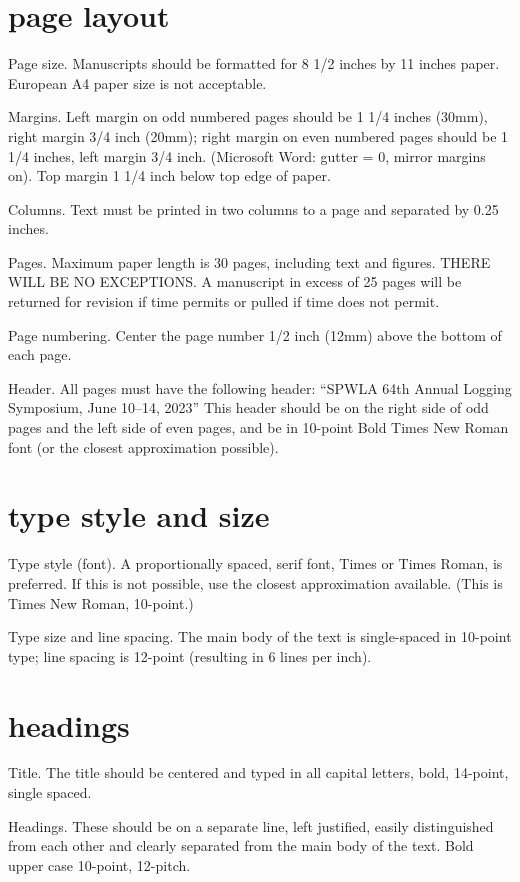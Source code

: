 \documentclass[10pt,twocolumn,twoside]{article}
\begin{document}
\section{page layout}
Page size. Manuscripts should be formatted for 8 1/2 inches by 11 inches paper. European A4 paper size is not acceptable.

Margins. Left margin on odd numbered pages should be 1 1/4 inches (30mm), right margin 3/4 inch (20mm); right margin on even numbered pages should be 1 1/4 inches, left margin 3/4 inch. (Microsoft Word: gutter = 0, mirror margins on). Top margin 1 1/4 inch below top edge of paper.

Columns. Text must be printed in two columns to a page and separated by 0.25 inches. 

Pages. Maximum paper length is 30 pages, including text and figures. THERE WILL BE NO EXCEPTIONS. A manuscript in excess of 25 pages will be returned for revision if time permits or pulled if time does not permit.

Page numbering. Center the page number 1/2 inch (12mm) above the bottom of each page.

Header. All pages must have the following header: “SPWLA 64th Annual Logging
Symposium, June 10--14, 2023” This header should be on the right side of odd pages and the left side of even pages, and be in 10-point Bold Times New Roman font (or the closest approximation possible).

\section{type style and size}
Type style (font). A proportionally spaced, serif font, Times or Times Roman, is preferred. If this is not possible, use the closest approximation available. (This is Times New Roman, 10-point.)

Type size and line spacing. The main body of the text is single-spaced in 10-point type; line spacing is 12-point (resulting in 6 lines per inch).

\section{headings}

Title. The title should be centered and typed in all capital letters, bold, 14-point, single spaced.

Headings. These should be on a separate line, left justified, easily distinguished from each other and clearly separated from the main body of the text. Bold upper case 10-point, 12-pitch.
\end{document}
